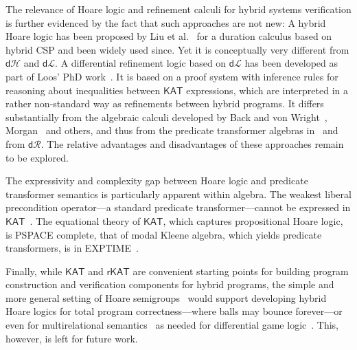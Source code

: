 \documentclass[envcountsame,envcountsect]{llncs}
\newcommand{\KAT}{\mathsf{KAT}}
\newcommand{\rKAT}{\mathsf{rKAT}}
\newcommand{\dL}{\mathsf{d}\mathcal{L}}
\newcommand{\dH}{\mathsf{d}\mathcal{H}}
\newcommand{\dR}{\mathsf{d}\mathcal{R}}
\begin{document}
The relevance of Hoare logic and refinement calculi for hybrid systems
verification is further evidenced by the fact that such approaches are
not new: A hybrid Hoare logic has been proposed by Liu et
al.~\cite{LiuLQZZZZ10} for a duration calculus based on hybrid CSP and
been widely used since. Yet it is conceptually very different from
$\dH$ and $\dL$. A differential refinement logic based on $\dL$ has
been developed as part of Loos' PhD work~\cite{LoosP16}.  It is based
on a proof system with inference rules for reasoning about
inequalities between $\KAT$ expressions, which are interpreted in a
rather non-standard way as refinements between hybrid programs. It
differs substantially from the algebraic calculi developed by Back and
von Wright~\cite{BackW98}, Morgan~\cite{Morgan94} and others, and thus
from the predicate transformer algebras in~\cite{MuniveS19} and from
$\dR$.  The relative advantages and disadvantages of these approaches
remain to be explored.

The expressivity and complexity gap between Hoare logic and predicate
transformer semantics is particularly apparent within algebra. The
weakest liberal precondition operator---a standard predicate
transformer---cannot be expressed in $\KAT$~\cite{Struth18}.  The
equational theory of $\KAT$, which captures propositional Hoare logic,
is PSPACE complete, that of modal Kleene algebra, which yields
predicate transformers, is in EXPTIME~\cite{MollerS06}.  

Finally, while $\KAT$ and $\rKAT$ are convenient starting points for
building program construction and verification components for hybrid
programs, the simple and more general setting of Hoare
semigroups~\cite{Struth18} would support developing hybrid Hoare
logics for total program correctness---where balls may bounce
forever---or even for multirelational
semantics~\cite{FurusawaS16,FurusawaS15} as needed for differential
game logic~\cite{Platzer18}. This, however, is left for future work.










\end{document}
